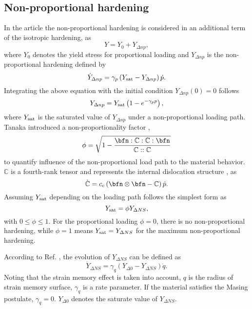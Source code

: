 \subsection{Non-proportional hardening}
\noindent
In the article the non-proportional hardening is considered in an additional term of the isotropic hardening, as
\begin{equation}
Y = {Y_0} + {Y_{\Delta np}},
\end{equation}
where $Y_0$ denotes the yield stress for proportional loading and ${Y_{\Delta np}}$ is the non-proportional hardening defined by
\begin{equation}
{\dot Y_{\Delta np}} = {\gamma _p}\left( {{Y_{\rm sat}} - {Y_{\Delta np}}} \right)\dot p.
\end{equation}
Integrating the above equation with the initial condition ${Y_{\Delta np}}(0)=0$ follows
\begin{equation}
{Y_{\Delta np}} = Y_{\rm sat}\left( 1-e^{- \gamma_p p} \right),
\end{equation}
where $Y_{\rm sat}$ is the saturated value of ${Y_{\Delta np}}$ under a non-proportional loading path.
Tanaka introduced a non-proportionality factor \cite{tanaka1994nonproportionality},
\begin{equation}
\phi  = \sqrt {1 - \frac{{\bfn:\mathbb{C}:\mathbb{C}:\bfn}}{{\mathbb{C}::\mathbb{C}}}}
\end{equation}
to quantify influence of the non-proportional load path to the material behavior.  $\mathbb{C}$ is a fourth-rank tensor and represents the internal dislocation structure \cite{tanaka1994nonproportionality}, as
\begin{equation}
\dot {\mathbb{C}} = {c_c}\left( {\bfn \otimes \bfn - \mathbb{C}} \right)\dot p.
\end{equation}
Assuming ${Y_{\rm sat}}$ depending on the loading path follows the simplest form as
\begin{equation}
{Y_{\rm sat}} = \phi {Y_{\Delta NS}},
\end{equation}
with $0 \leq \phi \leq 1$.
For the proportional loading $\phi = 0$, there is no non-proportional hardening, while $\phi = 1$ means ${Y_{\rm sat}} = {Y_{\Delta NS}}$ for the maximum non-proportional hardening.

According to Ref. \cite{fang2015cyclic}, the evolution of ${Y_{\Delta NS}}$ can be defined as
\begin{equation}
{\dot Y_{\Delta NS}} = {\gamma _q}\left( {{Y_{\Delta 0}} - {Y_{\Delta NS}}} \right)\dot q.
\end{equation}
Noting that the strain memory effect is taken into account, $q$ is the radius of strain memory surface, ${\gamma _q}$ is a rate parameter.
If the material satisfies the Masing postulate,  ${\gamma _q}=0$. $Y_{\Delta 0} $ denotes the saturate value of $Y_{\Delta NS}$.

